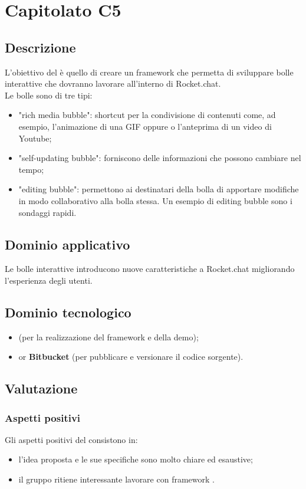 \section {Capitolato C5}
	\subsection {Descrizione}
		L'obiettivo del  è quello di creare un framework che permetta di sviluppare bolle interattive che dovranno lavorare all'interno di Rocket.chat. \\
		Le bolle sono di tre tipi:
		\begin{itemize}
			\item "rich media bubble": shortcut per la condivisione di contenuti come, ad esempio, l'animazione di una GIF oppure o l'anteprima di un video di Youtube;
			\item "self-updating bubble": forniscono delle informazioni che possono cambiare nel tempo;
			\item "editing bubble": permettono ai destinatari della bolla di apportare modifiche in modo collaborativo alla bolla stessa. Un esempio di editing bubble sono i sondaggi rapidi.
		\end{itemize}
	\subsection {Dominio applicativo}
		Le bolle interattive introducono nuove caratteristiche a Rocket.chat migliorando l'esperienza degli utenti.
	\subsection {Dominio tecnologico}
		\begin{itemize}
		\item \textbf{} (per la realizzazione del framework e della demo);
		\item \textbf{} or \textbf{Bitbucket} (per pubblicare e versionare il codice sorgente).
		\end{itemize}
	\subsection {Valutazione}
		\subsubsection {Aspetti positivi}
		Gli aspetti positivi del  consistono in:
			\begin{itemize}
				\item l’idea proposta e le sue specifiche sono molto chiare ed esaustive;
				\item il gruppo ritiene interessante lavorare con framework .
			\end{itemize}
